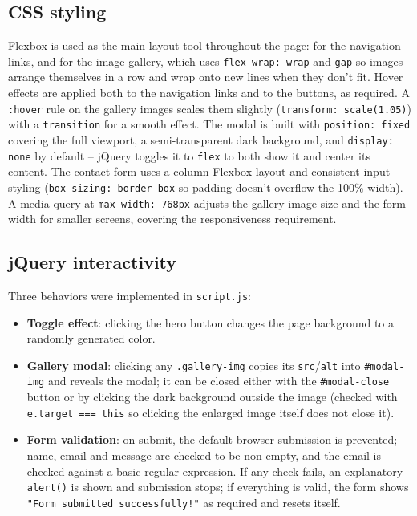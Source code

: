 \documentclass[12pt, a4paper]{article}
\begin{document}
\subsection{CSS styling}

Flexbox is used as the main layout tool throughout the page: for the navigation
links, and for the image gallery, which uses \texttt{flex-wrap: wrap} and
\texttt{gap} so images arrange themselves in a row and wrap onto new lines when
they don't fit. Hover effects are applied both to the navigation links and to the
buttons, as required. A \texttt{:hover} rule on the gallery images scales them
slightly (\texttt{transform: scale(1.05)}) with a \texttt{transition} for a smooth
effect. The modal is built with \texttt{position: fixed} covering the full
viewport, a semi-transparent dark background, and \texttt{display: none} by
default -- jQuery toggles it to \texttt{flex} to both show it and center its
content. The contact form uses a column Flexbox layout and consistent input
styling (\texttt{box-sizing: border-box} so padding doesn't overflow the 100\%
width). A media query at \texttt{max-width: 768px} adjusts the gallery image size
and the form width for smaller screens, covering the responsiveness requirement.

\subsection{jQuery interactivity}

Three behaviors were implemented in \texttt{script.js}:

\begin{itemize}
  \item \textbf{Toggle effect}: clicking the hero button changes the page
  background to a randomly generated color.
  \item \textbf{Gallery modal}: clicking any \texttt{.gallery-img} copies its
  \texttt{src}/\texttt{alt} into \texttt{\#modal-img} and reveals the modal; it can
  be closed either with the \texttt{\#modal-close} button or by clicking the dark
  background outside the image (checked with \texttt{e.target === this} so
  clicking the enlarged image itself does not close it).
  \item \textbf{Form validation}: on submit, the default browser submission is
  prevented; name, email and message are checked to be non-empty, and the email is
  checked against a basic regular expression. If any check fails, an explanatory
  \texttt{alert()} is shown and submission stops; if everything is valid, the form
  shows \texttt{"Form submitted successfully!"} as required and resets itself.
\end{itemize}
\end{document}
